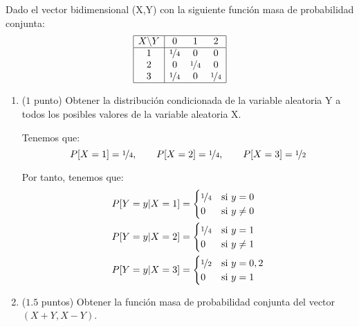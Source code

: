 \documentclass[12pt]{article}
\begin{document}
    \begin{ejercicio}
        Dado el vector bidimensional (X,Y) con la siguiente función masa de probabilidad conjunta:
        \begin{equation*}
            \begin{array}{|c|ccc|}
                \hline
                X\backslash Y & 0 & 1 & 2\\
                \hline
                1 & \nicefrac{1}{4} & 0 & 0\\
                2 & 0 & \nicefrac{1}{4} & 0\\
                3 & \nicefrac{1}{4} & 0 & \nicefrac{1}{4}\\
                \hline
            \end{array}
        \end{equation*}

        \begin{enumerate}
            \item ($1$ punto) Obtener la distribución condicionada de la variable aleatoria Y a todos los posibles valores de la variable aleatoria X.
            
            Tenemos que:
            \begin{equation*}
                P[X=1] = \nicefrac{1}{4},\qquad P[X=2] = \nicefrac{1}{4},\qquad P[X=3] = \nicefrac{1}{2}
            \end{equation*}

            Por tanto, tenemos que:
            \begin{align*}
                P[Y=y|X=1] &= \begin{cases}
                    \nicefrac{1}{4} & \text{si } y=0\\
                    0 & \text{si } y\neq 0
                \end{cases} \\
                P[Y=y|X=2] &= \begin{cases}
                    \nicefrac{1}{4} & \text{si } y=1 \\
                    0 & \text{si } y\neq 1
                \end{cases} \\
                P[Y=y|X=3] &= \begin{cases}
                    \nicefrac{1}{2} & \text{si } y=0,2\\
                    0 & \text{si } y=1
                \end{cases}
            \end{align*}
            \item ($1.5$ puntos) Obtener la función masa de probabilidad conjunta del vector $(X +Y,X -Y)$.
            

\end{enumerate}
\end{ejercicio}
\end{document}
